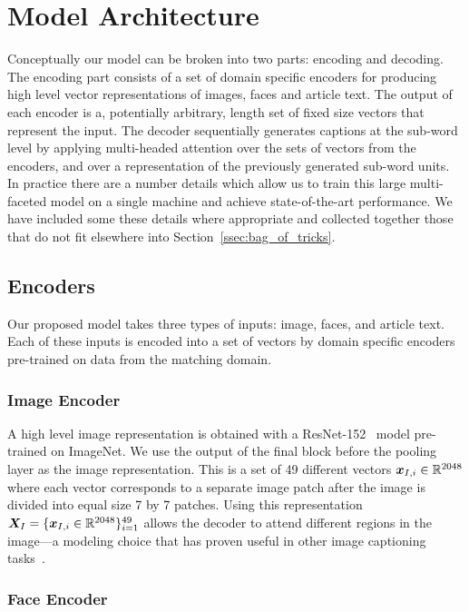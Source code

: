 
\section{Model Architecture}

Conceptually our model can be broken into two parts: encoding and decoding. The
encoding part consists of a set of domain specific encoders for producing high
level vector representations of images, faces and article text. The output of
each encoder is a, potentially arbitrary, length set of fixed size vectors that
represent the input. The decoder sequentially generates captions at the
sub-word level by applying
multi-headed attention over the sets of vectors from the encoders, and over a
representation of the previously generated sub-word units. In
practice there are a number details which allow us to train this large
multi-faceted model on a single machine and achieve state-of-the-art
performance. We have included some these details where appropriate and
collected together those that do not fit elsewhere into
Section~\ref{ssec:bag_of_tricks}.

\subsection{Encoders}

Our proposed model takes three types of inputs: image, faces, and article text.
Each of these inputs is encoded into a set of vectors by domain specific
encoders pre-trained on data from the matching domain.

\subsubsection{Image Encoder}

A high level image representation is obtained with a
ResNet-152~\cite{He2016ResNet} model pre-trained on ImageNet. We use the output
of the final block before the pooling layer as the image representation. This
is a set of 49 different vectors $\bm{x}_{I,i} \in \mathbb{R}^{2048}$ where each
vector corresponds to a separate image patch after the image is divided into
equal size 7 by 7 patches. Using this representation $\bm{X}_I = \{\bm{x}_{I,i} \in
\mathbb{R}^{2048}\}_{i=1}^{49}$ allows the decoder to attend different regions
in the image---a modeling choice that has proven useful in other image
captioning tasks~\cite{Xu2015ShowAA}.

\subsubsection{Face Encoder}

